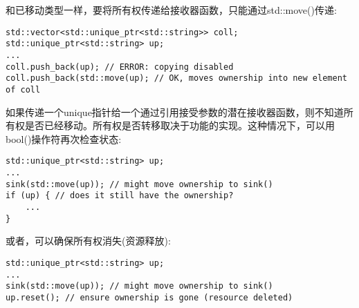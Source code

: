 和已移动类型一样，要将所有权传递给接收器函数，只能通过std::move()传递:\par

\begin{lstlisting}[caption={}]
std::vector<std::unique_ptr<std::string>> coll;
std::unique_ptr<std::string> up;
...
coll.push_back(up); // ERROR: copying disabled
coll.push_back(std::move(up); // OK, moves ownership into new element of coll
\end{lstlisting}

如果传递一个unique指针给一个通过引用接受参数的潜在接收器函数，则不知道所有权是否已经移动。所有权是否转移取决于功能的实现。这种情况下，可以用bool()操作符再次检查状态:\par

\begin{lstlisting}[caption={}]
std::unique_ptr<std::string> up;
...
sink(std::move(up)); // might move ownership to sink()
if (up) { // does it still have the ownership?
	...
}
\end{lstlisting}

或者，可以确保所有权消失(资源释放):\par

\begin{lstlisting}[caption={}]
std::unique_ptr<std::string> up;
...
sink(std::move(up)); // might move ownership to sink()
up.reset(); // ensure ownership is gone (resource deleted)
\end{lstlisting}














